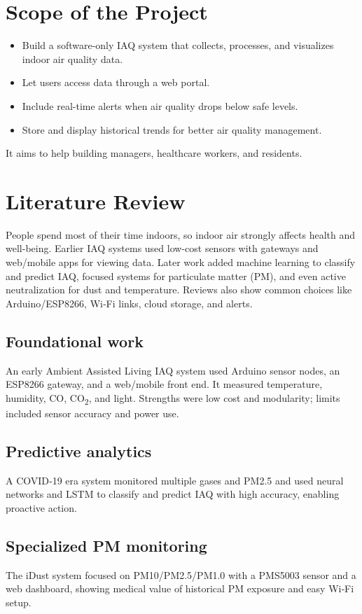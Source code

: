 \documentclass[12pt]{report}
\begin{document}
\section{Scope of the Project}
\begin{itemize}
  \item Build a software-only IAQ system that collects, processes, and visualizes indoor air quality data.
  \item Let users access data through a web portal.
  \item Include real-time alerts when air quality drops below safe levels.
  \item Store and display historical trends for better air quality management.
\end{itemize}
It aims to help building managers, healthcare workers, and residents.

\section{Literature Review}
People spend most of their time indoors, so indoor air strongly affects health and well-being. Earlier IAQ systems used low-cost sensors with gateways and web/mobile apps for viewing data. Later work added machine learning to classify and predict IAQ, focused systems for particulate matter (PM), and even active neutralization for dust and temperature. Reviews also show common choices like Arduino/ESP8266, Wi‑Fi links, cloud storage, and alerts.

\subsection{Foundational work}
An early Ambient Assisted Living IAQ system used Arduino sensor nodes, an ESP8266 gateway, and a web/mobile front end. It measured temperature, humidity, CO, CO\textsubscript{2}, and light. Strengths were low cost and modularity; limits included sensor accuracy and power use.

\subsection{Predictive analytics}
A COVID‑19 era system monitored multiple gases and PM2.5 and used neural networks and LSTM to classify and predict IAQ with high accuracy, enabling proactive action.

\subsection{Specialized PM monitoring}
The iDust system focused on PM10/PM2.5/PM1.0 with a PMS5003 sensor and a web dashboard, showing medical value of historical PM exposure and easy Wi‑Fi setup.
\end{document}
